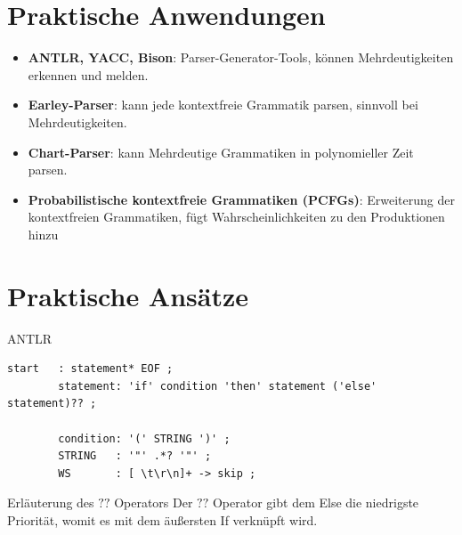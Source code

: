 \documentclass[t]{beamer}
\begin{document}
	\section{Praktische Anwendungen}\label{sec:praktische-ansatze1}
	\begin{frame}
        \vspace{3em}
	\begin{itemize}
		\item \textbf{ANTLR, YACC, Bison}: Parser-Generator-Tools, können Mehrdeutigkeiten erkennen und melden.
		\vspace{1em}
		\item \textbf{Earley-Parser}: kann jede kontextfreie Grammatik parsen, sinnvoll bei Mehrdeutigkeiten.\cite{qi2018generalized}
		\vspace{1em}
		\item \textbf{Chart-Parser}: kann Mehrdeutige Grammatiken in polynomieller Zeit parsen.
		\vspace{1em}
		\item \textbf{Probabilistische kontextfreie Grammatiken (PCFGs)}: Erweiterung der kontextfreien Grammatiken, fügt Wahrscheinlichkeiten zu den Produktionen hinzu
	\end{itemize}
	\end{frame}


	\section{Praktische Ansätze}\label{sec:praktische-ansatze2}
	\begin{frame}[fragile]
		\begin{block}{ANTLR}
			\hspace*{-3.5em}
			\begin{minipage}{\textwidth+3.5em}
				\begin{lstlisting}[style=antlr,label={lst:lstlisting3}]
        start   : statement* EOF ;
        statement: 'if' condition 'then' statement ('else' statement)?? ;

        condition: '(' STRING ')' ;
        STRING   : '"' .*? '"' ;
        WS       : [ \t\r\n]+ -> skip ;
                \end{lstlisting}
			\end{minipage}
		\end{block}
		\vspace{1em}
		\begin{exampleblock}{Erläuterung des \(??\) Operators \cite{parr}}
			Der \(??\) Operator gibt dem Else die niedrigste Priorität, womit es mit dem äußersten If verknüpft wird.
		\end{exampleblock}
	\end{frame}
\end{document}
